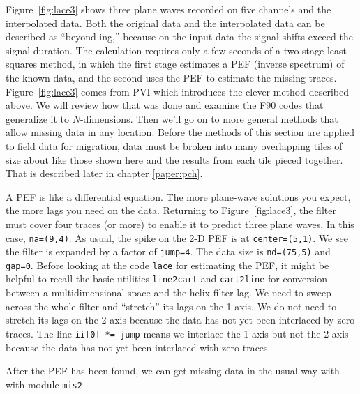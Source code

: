 
\par
Figure~\ref{fig:lace3} shows three plane waves recorded on five channels
and the interpolated data.
Both the original data and the interpolated data can be described
as ``beyond ing,'' because on the input data
the signal shifts exceed the signal duration.
The calculation requires only a few seconds
of a two-stage least-squares method, in which the first stage
estimates a PEF (inverse spectrum) of the known data,
and the second uses the PEF to estimate the missing traces.
Figure~\ref{fig:lace3} comes from PVI
which introduces the clever method described above.
We will review how that was done and examine the F90 codes
that generalize it to $N$-dimensions.
Then we'll go on to more general methods
that allow missing data in any location.
Before the methods of this section
are applied to field data for migration,
data must be broken into many overlapping tiles
of size about like those shown here
and the results from each tile pieced together.
That is described later in chapter \ref{paper:pch}.
\par
A PEF is like a differential equation.
The more plane-wave solutions you expect,
the more lags you need on the data.
Returning to Figure~\ref{fig:lace3},
the filter must cover four traces (or more)
to enable it to predict three plane waves.
In this case,
\texttt{na=(9,4)}.
As usual, the spike on the 2-D PEF is at
\texttt{center=(5,1)}.
We see the filter is expanded by a factor of
\texttt{jump=4}.
The data size is
\texttt{nd=(75,5)}
and \texttt{gap=0}.
Before looking at the code
\texttt{lace} 
for estimating the PEF,
it might be helpful to recall the basic utilities
\texttt{line2cart} and
\texttt{cart2line}
for conversion between a multidimensional space and
the helix filter lag.
We need to sweep across the whole filter
and ``stretch'' its lags on the 1-axis.
We do not need to stretch its lags on the 2-axis
because the data has not yet been interlaced by zero traces.
The line \texttt{ii[0] *= jump}
means we interlace the 1-axis but not the 2-axis because
the data has not yet been interlaced with zero traces.
\begin{comment}
For a 3-D filter
\texttt{aa(na1,na2,na3)},
the somewhat obtuse expression
\texttt{(/na(1)*jump, na(2:)/)}
is a three component
vector containing
\texttt{(na1*jump, na2, na3)}.
\end{comment}
\par
After the PEF has been found, we can get missing data in
the usual way with with module
\texttt{mis2} .



